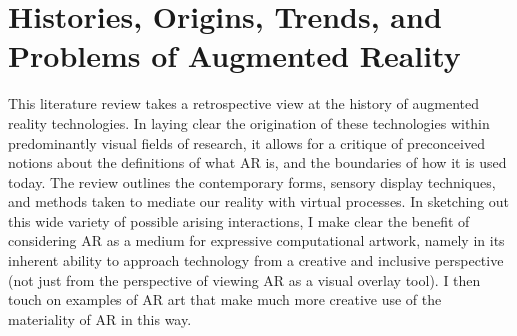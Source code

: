 \chapter{Histories, Origins, Trends, and Problems of Augmented Reality}
\label{sec: review}
\epigraph{\textit{}}{}
This literature review takes a retrospective view at the history of augmented reality technologies. In laying clear the origination of these technologies within predominantly visual fields of research, it allows for a critique of preconceived notions about the definitions of what AR is, and the boundaries of how it is used today. The review outlines the contemporary forms, sensory display techniques, and methods taken to mediate our reality with virtual processes. In sketching out this wide variety of possible arising interactions, I make clear the benefit of considering AR as a medium for expressive computational artwork, namely in its inherent ability to approach technology from a creative and inclusive perspective (not just from the perspective of viewing AR as a visual overlay tool). I then touch on examples of AR art that make much more creative use of the materiality of AR in this way.



